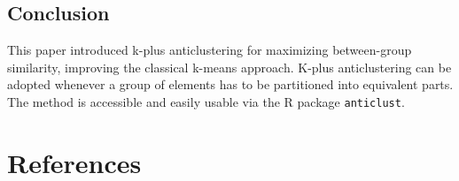 \documentclass[
  man,floatsintext]{apa7}
\begin{document}
\hypertarget{conclusion}{%
\subsection{Conclusion}\label{conclusion}}

This paper introduced k-plus anticlustering for maximizing between-group similarity, improving the classical k-means approach. K-plus anticlustering can be adopted whenever a group of elements has to be partitioned into equivalent parts. The method is accessible and easily usable via the R package \texttt{anticlust}.

\newpage

\hypertarget{references}{%
\section{References}\label{references}}

\begingroup
\end{document}
